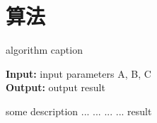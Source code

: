 \section{算法}
\begin{algorithm}[t]
	\caption{algorithm caption} %
	\hspace*{0.02in} {\bf Input:} %
	input parameters A, B, C\\
	\hspace*{0.02in} {\bf Output:} %
	output result
	\begin{algorithmic}[1]
		\State some description %
		\State ...
		\State ...
		\Else
		\State ...
		\EndIf
		\EndFor
		\State ...
		\EndWhile
		\State \Return result
	\end{algorithmic}
\end{algorithm}